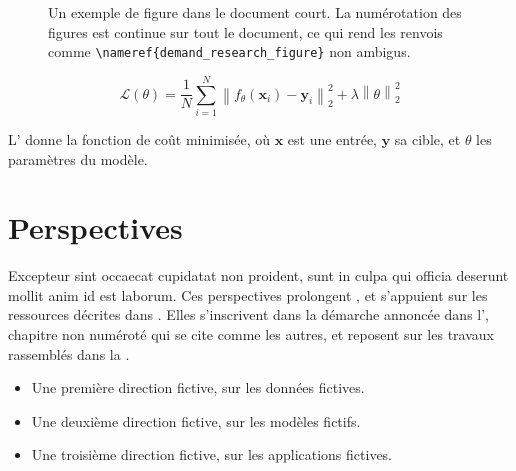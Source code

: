 \begin{figure}[demand_research_figure]{Un exemple de figure dans le document court. La numérotation des figures est continue sur tout le document, ce qui rend les renvois comme \texttt{\textbackslash nameref\{demand\_research\_figure\}} non ambigus.}
    
\end{figure}

\begin{equation}[demand_research_equation]
    \mathcal{L}(\theta) = \frac{1}{N} \sum_{i = 1}^{N} \left\| f_\theta(\bm{x}_i) - \bm{y}_i \right\|_2^2 + \lambda \left\| \theta \right\|_2^2
\end{equation}

L' donne la fonction de coût minimisée, où $\bm{x}$ est une entrée, $\bm{y}$ sa cible, et $\theta$ les paramètres du modèle.

\section[demand_research_future]{Perspectives}

Excepteur sint occaecat cupidatat non proident, sunt in culpa qui officia deserunt mollit anim id est laborum.
Ces perspectives prolongent \cite{lastname2025preprint}, et s'appuient sur les ressources décrites dans \cite{placeholder_www}.
Elles s'inscrivent dans la démarche annoncée dans l', chapitre non numéroté qui se cite comme les autres, et reposent sur les travaux rassemblés dans la .

\begin{itemize}
    \item Une première direction fictive, sur les données fictives.
    \item Une deuxième direction fictive, sur les modèles fictifs.
    \item Une troisième direction fictive, sur les applications fictives.
\end{itemize}


\printbibliography
